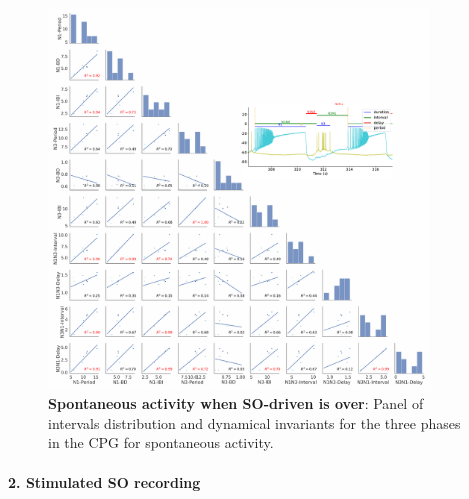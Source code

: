  
\begin{figure}[htbp]
	\centering
	\includegraphics[width=0.9\textwidth]{./invariants/data/SUSSEX/prep4_so_no_driven/images/panel_with_pairplot.pdf}
	\caption{\textbf{Spontaneous activity when SO-driven is over}: Panel of intervals distribution and dynamical invariants for the three phases in the CPG for spontaneous activity.}
	\label{fig:no so spontaneous invariants pairplot}
\end{figure}
 
\paragraph{2. Stimulated SO recording}


